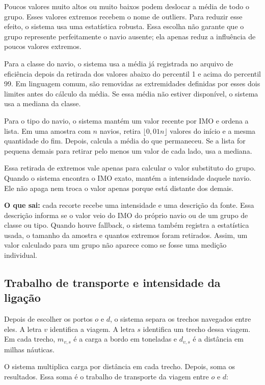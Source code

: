 \documentclass[12pt,a4paper]{article}
\begin{document}
Poucos valores muito altos ou muito baixos podem deslocar a média de todo o grupo. Esses valores extremos recebem o nome de outliers. Para reduzir esse efeito, o sistema usa uma estatística robusta. Essa escolha não garante que o grupo represente perfeitamente o navio ausente; ela apenas reduz a influência de poucos valores extremos.

Para a classe do navio, o sistema usa a média já registrada no arquivo de eficiência depois da retirada dos valores abaixo do percentil 1 e acima do percentil 99. Em linguagem comum, são removidas as extremidades definidas por esses dois limites antes do cálculo da média. Se essa média não estiver disponível, o sistema usa a mediana da classe.

Para o tipo do navio, o sistema mantém um valor recente por IMO e ordena a lista. Em uma amostra com $n$ navios, retira $\lfloor0{,}01n\rfloor$ valores do início e a mesma quantidade do fim. Depois, calcula a média do que permaneceu. Se a lista for pequena demais para retirar pelo menos um valor de cada lado, usa a mediana.

Essa retirada de extremos vale apenas para calcular o valor substituto do grupo. Quando o sistema encontra o IMO exato, mantém a intensidade daquele navio. Ele não apaga nem troca o valor apenas porque está distante dos demais.

\textbf{O que sai:} cada recorte recebe uma intensidade e uma descrição da fonte. Essa descrição informa se o valor veio do IMO do próprio navio ou de um grupo de classe ou tipo. Quando houve fallback, o sistema também registra a estatística usada, o tamanho da amostra e quantos extremos foram retirados. Assim, um valor calculado para um grupo não aparece como se fosse uma medição individual.

\subsection{Trabalho de transporte e intensidade da ligação}
\label{subsec:intensidade-par}

Depois de escolher os portos $o$ e $d$, o sistema separa os trechos navegados entre eles. A letra $v$ identifica a viagem. A letra $s$ identifica um trecho dessa viagem. Em cada trecho, $m_{v,s}$ é a carga a bordo em toneladas e $d_{v,s}$ é a distância em milhas náuticas.

O sistema multiplica carga por distância em cada trecho. Depois, soma os resultados. Essa soma é o trabalho de transporte da viagem entre $o$ e $d$:
\end{document}
